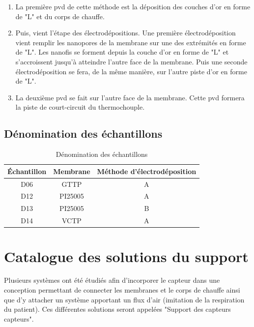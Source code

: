 \begin{itemize}
\begin{enumerate}[label=(\alph*), wide, labelwidth=!, labelindent = 0pt]
              \item La première \gls{pvd} de cette méthode est la déposition des couches d'or en forme de "L" et du corps de chauffe.\\
              \item Puis, vient l'étape des électrodépositions. Une première électrodéposition vient remplir les nanopores de la membrane sur une
                    des extrémités en forme de "L". Les nanofis se forment depuis la couche d'or en forme de "L" et s'accroissent jusqu'à 
                    atteindre l'autre face de la membrane. Puis une seconde électrodéposition se fera, de la même manière, sur l'autre piste d'or 
                    en forme de "L".\\
              \item La deuxième \gls{pvd} se fait sur l'autre face de la membrane. Cette \gls{pvd} formera la piste de court-circuit du thermochouple.
          \end{enumerate}
\end{itemize}

\subsection{Dénomination des échantillons}
\begin{table}[H]
    \centering
    \begin{tabular}{|c|c|c|}
        \hline
        Échantillon & Membrane & Méthode d'électrodéposition \\
        \hline
        D06         & GTTP     & A                           \\
        \hline
        D12         & PI25005  & A                           \\
        \hline
        D13         & PI25005  & B                           \\
        \hline
        D14         & VCTP     & A                           \\
        \hline
    \end{tabular}
    \caption{Dénomination des échantillons}
\end{table}

\newpage
\section{Catalogue des solutions du support}
\label{chap:catalogueSol}
Plusieurs systèmes ont été étudiés afin d'incorporer le capteur dans une conception permettant de connecter les membranes et le corps de chauffe
ainsi que d'y attacher un système apportant un flux d'air (imitation de la respiration du patient). Ces différentes solutions seront appelées
"Support des capteurs \gls{capteur}s".

